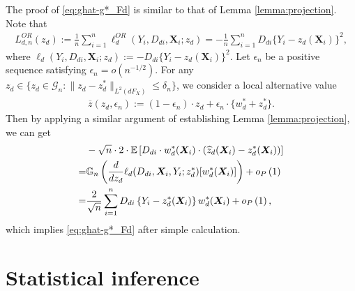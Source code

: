 \documentclass[11pt]{article}
\numberwithin{equation}{section}
\begin{document}
The proof of \eqref{eq:ghat-g*_Fd} is similar to that of Lemma \ref{lemma:projection}.	Note that
\begin{align*}
	L^{OR}_{d,n}(z_d):= \frac{1}{n}\sum_{i=1}^{n}\ell^{OR}_d(Y_i,D_{di},\boldsymbol{X}_{i};z_d)=- \frac{1}{n}\sum_{i=1}^{n}D_{di}\{Y_i-z_d(\boldsymbol{X}_{i})\}^2,
\end{align*}
where $\ell_d(Y_i,D_{di},\boldsymbol{X}_{i};z_d):=-D_{di}\{Y_i-z_d(\boldsymbol{X}_{i})\}^2$.  Let $\epsilon_n$ be a positive sequence satisfying $\epsilon_n=o(n^{-1/2})$.
For any $z_d\in \{z_d\in\mathcal{G}_n:\|z_d-z_d^*\|_{L^2(dF_X)}\leq \delta_n \}$, we consider a local alternative value
\begin{align*}
	\overline{z}(z_d,\epsilon_n):=(1-\epsilon_n)\cdot z_d+\epsilon_n\cdot \{w_d^*+z_d^*\}.
\end{align*}
Then by applying a similar argument  of establishing Lemma \ref{lemma:projection},  we can get
\begin{align}
	&-\sqrt{n}\cdot 2\cdot \mathbb{E}\left[ D_{di}\cdot w_d^*(\boldsymbol{X}_{i}) \cdot (\widehat{z}_d(\boldsymbol{X}_{i})-z^*_d(\boldsymbol{X}_{i}))\right]\notag\\
	=&\mathbb{G}_n\left(\frac{d}{dz_d}\ell_d(D_{di},\boldsymbol{X}_{i},Y_i;z^*_d)[w_d^*(\boldsymbol{X}_{i})]\right)+o_P\left(1\right) \notag\\
	=&\frac{2}{\sqrt{n}}\sum_{i=1}^nD_{di}\left\{Y_i-z^*_d(\boldsymbol{X}_{i})\right\} w_d^*(\boldsymbol{X}_{i}) +o_P\left(1\right),\label{eq:ghat-g*_u*_0}
\end{align}
which implies \eqref{eq:ghat-g*_Fd} after simple calculation.


\section{Statistical inference}\label{appendix:eff_IPW_bootsrap}
\end{document}
